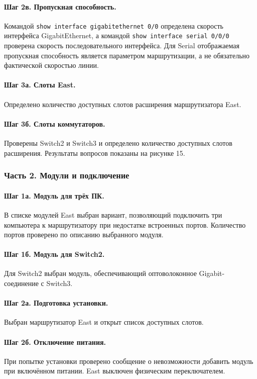 \documentclass[a4paper,14pt,oneside]{extarticle}
\begin{document}
\paragraph{Шаг 2в. Пропускная способность.}
Командой \texttt{show interface gigabitethernet 0/0} определена скорость
интерфейса GigabitEthernet, а командой \texttt{show interface serial 0/0/0}
проверена скорость последовательного интерфейса. Для Serial отображаемая
пропускная способность является параметром маршрутизации, а не обязательно
фактической скоростью линии.

\paragraph{Шаг 3а. Слоты East.}
Определено количество доступных слотов расширения маршрутизатора East.

\paragraph{Шаг 3б. Слоты коммутаторов.}
Проверены Switch2 и Switch3 и определено количество доступных слотов
расширения. Результаты вопросов показаны на рисунке 15.

\subsubsection{Часть 2. Модули и подключение}

\paragraph{Шаг 1а. Модуль для трёх ПК.}
В списке модулей East выбран вариант, позволяющий подключить три
компьютера к маршрутизатору при недостатке встроенных портов. Количество
портов проверено по описанию выбранного модуля.

\paragraph{Шаг 1б. Модуль для Switch2.}
Для Switch2 выбран модуль, обеспечивающий оптоволоконное Gigabit-соединение
с Switch3.

\paragraph{Шаг 2а. Подготовка установки.}
Выбран маршрутизатор East и открыт список доступных слотов.

\paragraph{Шаг 2б. Отключение питания.}
При попытке установки проверено сообщение о невозможности добавить модуль
при включённом питании. East выключен физическим переключателем.
\end{document}
